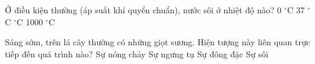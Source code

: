\documentclass[FileMain.tex]{subfiles}
\begin{document}
\begin{ex}%
Ở điều kiện thường (áp suất khí quyển chuẩn), nước sôi ở nhiệt độ nào?
\choice
{0 $^\circ$C}
{37 $^\circ$C}
{ $^\circ$C}
{1000 $^\circ$C}
\end{ex}

\begin{ex}%
Sáng sớm, trên lá cây thường có những giọt sương. Hiện tượng này liên quan trực tiếp đến quá trình nào?
\choice
{Sự nóng chảy}
{\True Sự ngưng tụ}
{Sự đông đặc}
{Sự sôi}
\end{ex}

\end{document}
